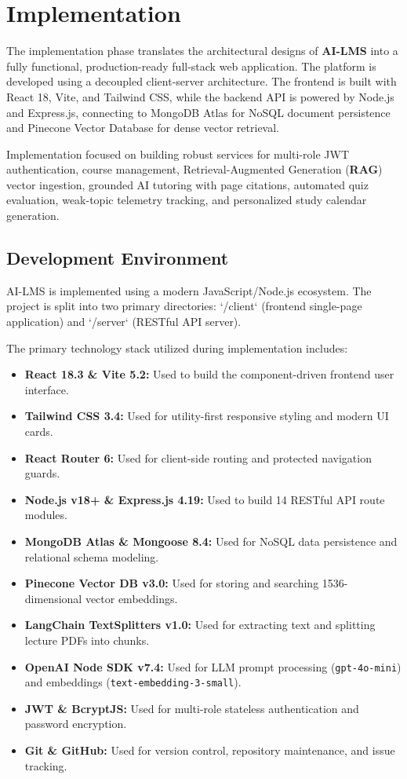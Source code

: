 \chapter{Implementation}

The implementation phase translates the architectural designs of \textbf{AI-LMS} into a fully functional, production-ready full-stack web application. The platform is developed using a decoupled client-server architecture. The frontend is built with React 18, Vite, and Tailwind CSS, while the backend API is powered by Node.js and Express.js, connecting to MongoDB Atlas for NoSQL document persistence and Pinecone Vector Database for dense vector retrieval.

Implementation focused on building robust services for multi-role JWT authentication, course management, Retrieval-Augmented Generation (\textbf{RAG}) vector ingestion, grounded AI tutoring with page citations, automated quiz evaluation, weak-topic telemetry tracking, and personalized study calendar generation.

\section{Development Environment}

AI-LMS is implemented using a modern JavaScript/Node.js ecosystem. The project is split into two primary directories: `/client` (frontend single-page application) and `/server` (RESTful API server).

The primary technology stack utilized during implementation includes:

\begin{itemize}
    \item \textbf{React 18.3 \& Vite 5.2:} Used to build the component-driven frontend user interface.
    \item \textbf{Tailwind CSS 3.4:} Used for utility-first responsive styling and modern UI cards.
    \item \textbf{React Router 6:} Used for client-side routing and protected navigation guards.
    \item \textbf{Node.js v18+ \& Express.js 4.19:} Used to build 14 RESTful API route modules.
    \item \textbf{MongoDB Atlas \& Mongoose 8.4:} Used for NoSQL data persistence and relational schema modeling.
    \item \textbf{Pinecone Vector DB v3.0:} Used for storing and searching 1536-dimensional vector embeddings.
    \item \textbf{LangChain TextSplitters v1.0:} Used for extracting text and splitting lecture PDFs into chunks.
    \item \textbf{OpenAI Node SDK v7.4:} Used for LLM prompt processing (\texttt{gpt-4o-mini}) and embeddings (\texttt{text-embedding-3-small}).
    \item \textbf{JWT \& BcryptJS:} Used for multi-role stateless authentication and password encryption.
    \item \textbf{Git \& GitHub:} Used for version control, repository maintenance, and issue tracking.
\end{itemize}


